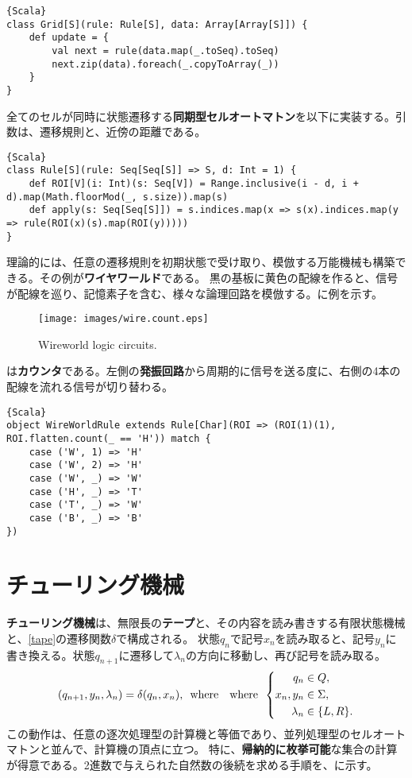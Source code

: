 \documentclass[10pt,a4paper]{book}
\begin{document}
\begin{Verbatim}{Scala}
class Grid[S](rule: Rule[S], data: Array[Array[S]]) {
	def update = {
		val next = rule(data.map(_.toSeq).toSeq)
		next.zip(data).foreach(_.copyToArray(_))
	}
}
\end{Verbatim}

全てのセルが同時に状態遷移する\textbf{同期型セルオートマトン}を以下に実装する。引数は、遷移規則と、近傍の距離である。

\begin{Verbatim}{Scala}
class Rule[S](rule: Seq[Seq[S]] => S, d: Int = 1) {
	def ROI[V](i: Int)(s: Seq[V]) = Range.inclusive(i - d, i + d).map(Math.floorMod(_, s.size)).map(s)
	def apply(s: Seq[Seq[S]]) = s.indices.map(x => s(x).indices.map(y => rule(ROI(x)(s).map(ROI(y)))))
}
\end{Verbatim}

理論的には、任意の遷移規則を初期状態で受け取り、模倣する万能機械も構築できる。その例が\textbf{ワイヤワールド}である。
黒の基板に黄色の配線を作ると、信号が配線を巡り、記憶素子を含む、様々な論理回路を模倣する。に例を示す。

\begin{figure}[h]
\centering
\texttt{[image: images/wire.count.eps]}
\caption{Wireworld logic circuits.\label{fig:wire}}
\end{figure}

は\textbf{カウンタ}である。左側の\textbf{発振回路}から周期的に信号を送る度に、右側の4本の配線を流れる信号が切り替わる。

\begin{Verbatim}{Scala}
object WireWorldRule extends Rule[Char](ROI => (ROI(1)(1), ROI.flatten.count(_ == 'H')) match {
	case ('W', 1) => 'H'
	case ('W', 2) => 'H'
	case ('W', _) => 'W'
	case ('H', _) => 'T'
	case ('T', _) => 'W'
	case ('B', _) => 'B'
})
\end{Verbatim}

\section{チューリング機械\label{sect:turing}}

\textbf{チューリング機械}は、無限長の\textbf{テープ}と、その内容を読み書きする有限状態機械と、\eqref{tape}の遷移関数$\delta$で構成される。
状態$q_n$で記号$x_n$を読み取ると、記号$y_n$に書き換える。状態$q_{n+1}$に遷移して$\lambda_n$の方向に移動し、再び記号を読み取る。
%
\begin{equation}
\label{eq:tape}
(q_{n+1},y_n,\lambda_n) = \delta(q_n,x_n),
\enspace\mathrm{where}\enspace
\enspace\mathrm{where}\enspace
\left\{
\begin{aligned}
q_n &\in Q,\\
x_n,y_n &\in \Sigma,\\
\lambda_n &\in \{L,R\}.
\end{aligned}
\right.
\end{equation}
%
この動作は、任意の逐次処理型の計算機と等価であり、並列処理型のセルオートマトンと並んで、計算機の頂点に立つ。
特に、\textbf{帰納的に枚挙可能}な集合の計算が得意である。2進数で与えられた自然数の後続を求める手順を、に示す。
\end{document}
